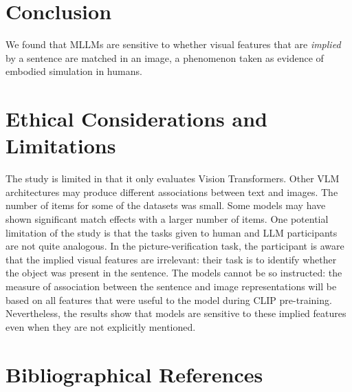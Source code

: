 \documentclass[10pt, a4paper]{article}
\begin{document}
\section{Conclusion}

We found that MLLMs are sensitive to whether visual features that are \textit{implied} by a sentence are matched in an image, a phenomenon taken as evidence of embodied simulation in humans.









\section{Ethical Considerations and Limitations}

The study is limited in that it only evaluates Vision Transformers. Other VLM architectures may produce different associations between text and images.
The number of items for some of the datasets was small. Some models may have shown significant match effects with a larger number of items.
One potential limitation of the study is that the tasks given to human and LLM participants are not quite analogous.
In the picture-verification task, the participant is aware that the implied visual features are irrelevant: their task is to identify whether the object was present in the sentence.
The models cannot be so instructed: the measure of association between the sentence and image representations will be based on all features that were useful to the model during CLIP pre-training.
Nevertheless, the results show that models are sensitive to these implied features even when they are not explicitly mentioned.


\section{Bibliographical References}\label{sec:reference}


% 


\label{lr:ref}
\end{document}

